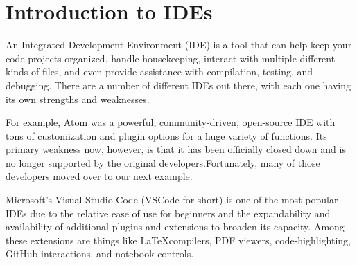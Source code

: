 \section{Introduction to IDEs}

An Integrated Development Environment (IDE) is a tool that can help keep your code projects organized, handle housekeeping, interact with multiple different kinds of files, and even provide assistance with compilation, testing, and debugging.
There are a number of different IDEs out there, with each one having its own strengths and weaknesses.

For example, Atom was a powerful, community-driven, open-source IDE with tons of customization and plugin options for a huge variety of functions.
Its primary weakness now, however, is that it has been officially closed down and is no longer supported by the original developers.Fortunately, many of those developers moved over to our next example.

Microsoft's Visual Studio Code (VSCode for short) is one of the most popular IDEs due to the relative ease of use for beginners and the expandability and availability of additional plugins and extensions to broaden its capacity.
Among these extensions are things like \LaTeX compilers, PDF viewers, code-highlighting, GitHub interactions, and notebook controls.